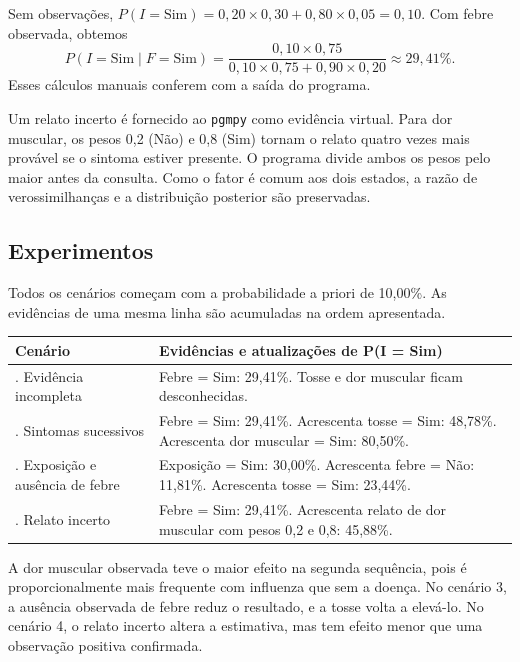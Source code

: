 \documentclass[12pt,a4paper]{article}
\begin{document}
Sem observações, $P(I=\mathrm{Sim}) = 0{,}20 \times 0{,}30 + 0{,}80 \times 0{,}05 = 0{,}10$.
Com febre observada, obtemos
\[
P(I=\mathrm{Sim}\mid F=\mathrm{Sim})
  = \frac{0{,}10 \times 0{,}75}{0{,}10 \times 0{,}75 + 0{,}90 \times 0{,}20}
  \approx 29{,}41\%.
\]
Esses cálculos manuais conferem com a saída do programa.

Um relato incerto é fornecido ao \texttt{pgmpy} como evidência virtual. Para dor muscular, os pesos 0,2 (Não) e 0,8 (Sim) tornam o relato quatro vezes mais provável se o sintoma estiver presente. O programa divide ambos os pesos pelo maior antes da consulta. Como o fator é comum aos dois estados, a razão de verossimilhanças e a distribuição posterior são preservadas.

\subsection{Experimentos}

Todos os cenários começam com a probabilidade a priori de 10,00\%. As evidências de uma mesma linha são acumuladas na ordem apresentada.

\begin{table}[htbp]
    \centering
    \begin{tabular}{>{\raggedright\arraybackslash}p{4.8cm} >{\raggedright\arraybackslash}p{10.0cm}}
        \toprule
        \textbf{Cenário} & \textbf{Evidências e atualizações de P(I = Sim)} \\
        \midrule
        1. Evidência incompleta & Febre = Sim: 29,41\%. Tosse e dor muscular ficam desconhecidas. \\
        \addlinespace
        2. Sintomas sucessivos & Febre = Sim: 29,41\%. Acrescenta tosse = Sim: 48,78\%. Acrescenta dor muscular = Sim: 80,50\%. \\
        \addlinespace
        3. Exposição e ausência de febre & Exposição = Sim: 30,00\%. Acrescenta febre = Não: 11,81\%. Acrescenta tosse = Sim: 23,44\%. \\
        \addlinespace
        4. Relato incerto & Febre = Sim: 29,41\%. Acrescenta relato de dor muscular com pesos 0,2 e 0,8: 45,88\%. \\
        \bottomrule
    \end{tabular}
\end{table}

A dor muscular observada teve o maior efeito na segunda sequência, pois é proporcionalmente mais frequente com influenza que sem a doença. No cenário 3, a ausência observada de febre reduz o resultado, e a tosse volta a elevá-lo. No cenário 4, o relato incerto altera a estimativa, mas tem efeito menor que uma observação positiva confirmada.
\end{document}
